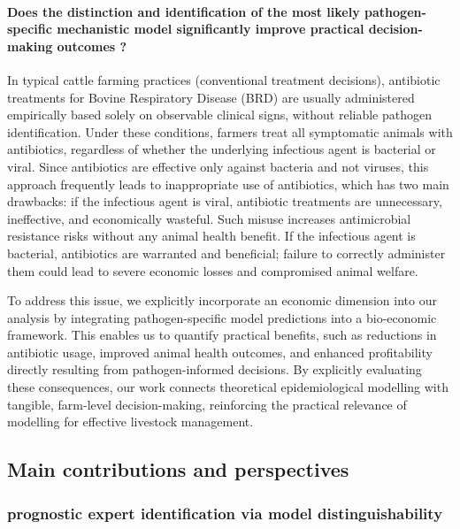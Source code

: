 \paragraph{Does the distinction and identification of the most likely pathogen-specific mechanistic model significantly improve practical decision-making outcomes ?} In typical cattle farming practices (conventional treatment decisions), antibiotic treatments for Bovine Respiratory Disease (BRD) are usually administered empirically based solely on observable clinical signs, without reliable pathogen identification. Under these conditions, farmers treat all symptomatic animals with antibiotics, regardless of whether the underlying infectious agent is bacterial or viral. Since antibiotics are effective only against bacteria and not viruses, this approach frequently leads to inappropriate use of antibiotics, which has two main drawbacks: if the infectious agent is viral, antibiotic treatments are unnecessary, ineffective, and economically wasteful. Such misuse increases antimicrobial resistance risks without any animal health benefit. If the infectious agent is bacterial, antibiotics are warranted and beneficial; failure to correctly administer them could lead to severe economic losses and compromised animal welfare.

To address this issue, we explicitly incorporate an economic dimension into our analysis by integrating pathogen-specific model predictions into a bio-economic framework. This enables us to quantify practical benefits, such as reductions in antibiotic usage, improved animal health outcomes, and enhanced profitability directly resulting from pathogen-informed decisions. By explicitly evaluating these consequences, our work connects theoretical epidemiological modelling with tangible, farm-level decision-making, reinforcing the practical relevance of modelling for effective livestock management.




\subsection{Main contributions and perspectives}

\subsubsection*{prognostic expert identification via model distinguishability}

